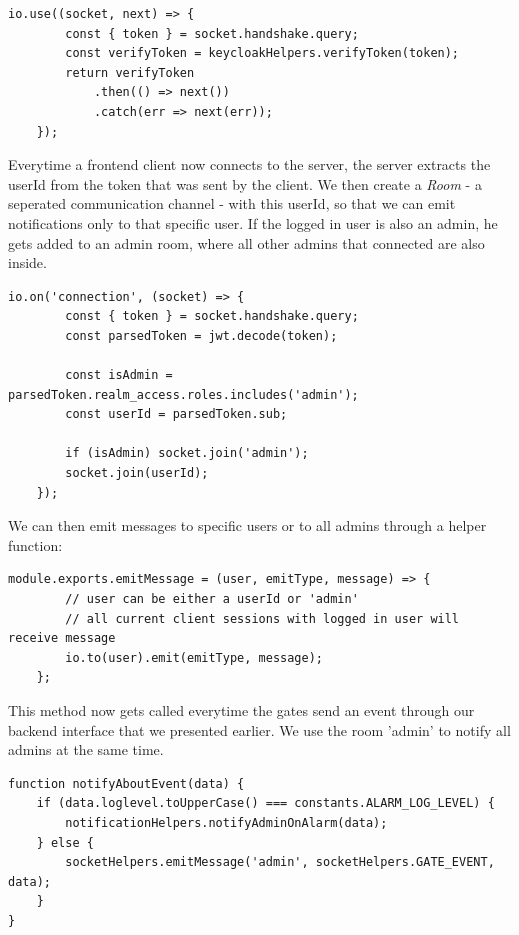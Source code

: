 \begin{lstlisting}[label=createSocketIOMiddleware]
    io.use((socket, next) => {
        const { token } = socket.handshake.query;
        const verifyToken = keycloakHelpers.verifyToken(token);
        return verifyToken
            .then(() => next())
            .catch(err => next(err));
    });
\end{lstlisting}

Everytime a frontend client now connects to the server, the server extracts the userId from the token that was sent by the client. We then create a \emph{Room}\cite{socketio:rooms} - a seperated communication channel - with this userId, so that we can emit notifications only to that specific user. If the logged in user is also an admin, he gets added to an admin room, where all other admins that connected are also inside.

\begin{lstlisting}[label=onConnection]
io.on('connection', (socket) => {
        const { token } = socket.handshake.query;
        const parsedToken = jwt.decode(token);

        const isAdmin = parsedToken.realm_access.roles.includes('admin');
        const userId = parsedToken.sub;

        if (isAdmin) socket.join('admin');
        socket.join(userId);
    });
\end{lstlisting}

We can then emit messages to specific users or to all admins through a helper function:
\begin{lstlisting}[label=emitMessage]
module.exports.emitMessage = (user, emitType, message) => {
        // user can be either a userId or 'admin'
        // all current client sessions with logged in user will receive message
        io.to(user).emit(emitType, message);
    };
\end{lstlisting}

This method now gets called everytime the gates send an event through our backend interface that we presented earlier. We use the room 'admin' to notify all admins at the same time.

\begin{lstlisting}[label=socketIOBackendNotification]
function notifyAboutEvent(data) {
    if (data.loglevel.toUpperCase() === constants.ALARM_LOG_LEVEL) {
        notificationHelpers.notifyAdminOnAlarm(data);
    } else {
        socketHelpers.emitMessage('admin', socketHelpers.GATE_EVENT, data);
    }
}
\end{lstlisting}

